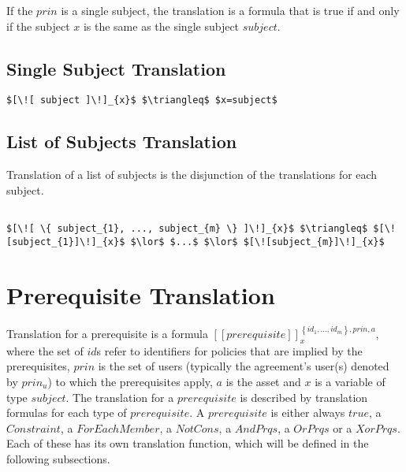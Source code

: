 If the $prin$ is a single subject, the translation is a formula that is true if and only if the subject $x$ is the same as the single subject $subject$.

\subsection{Single Subject Translation}
\lstset{mathescape, language=AST}  
\begin{lstlisting}[frame=single, caption={Prin Translation {$\colon$} Single subject},label={lst:transprinSingle}]
$[\![ subject ]\!]_{x}$ $\triangleq$ $x=subject$
\end{lstlisting}

\subsection{List of Subjects Translation}
Translation of a list of subjects is the disjunction of the translations for each subject.

\lstset{mathescape, language=AST}  
\begin{lstlisting}[frame=single, caption={Prin Translation {$\colon$} List of subjects},label={lst:transprinListOfSubjects}]

$[\![ \{ subject_{1}, ..., subject_{m} \} ]\!]_{x}$ $\triangleq$ $[\![subject_{1}]\!]_{x}$ $\lor$ $...$ $\lor$ $[\![subject_{m}]\!]_{x}$

\end{lstlisting}




\section{Prerequisite Translation}

Translation for a prerequisite is a formula $[\![prerequisite]\!]^{\left\{ {id_{1}, ..., id_{m}}\right\}, prin, a}_{x}$, where the set of $id$s refer to identifiers for policies that are implied by the prerequisites, $prin$ is the set of users (typically the agreement's user(s) denoted by $prin_{u}$) to which the prerequisites apply, $a$ is the asset and $x$ is a variable of type $subject$. The translation for a $prerequisite$ is described by translation formulas for each type of $prerequisite$. A $prerequisite$ is either always $true$, a $Constraint$, a $ForEachMember$, a $NotCons$, a $AndPrqs$, a $OrPrqs$ or a $XorPrqs$. Each of these has its own translation function, which will be defined in the following subsections.

